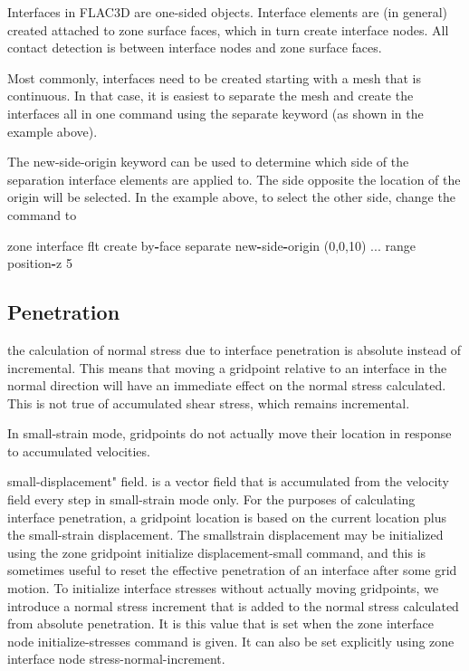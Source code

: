 \documentclass[a4paper, nobind]{templates/ociamthesis}
\newenvironment{Shaded}{\begin{snugshade}}{\end{snugshade}}
\newcommand{\BuiltInTok}[1]{#1}
\newcommand{\DecValTok}[1]{\textcolor[rgb]{0.00,0.00,0.81}{#1}}
\newcommand{\NormalTok}[1]{#1}
\newcommand{\OperatorTok}[1]{\textcolor[rgb]{0.81,0.36,0.00}{\textbf{#1}}}
\newcommand{\StringTok}[1]{\textcolor[rgb]{0.31,0.60,0.02}{#1}}
\renewenvironment{Shaded}
{
  \vspace{10pt}%
  \begin{snugshade}%
}{%
  \end{snugshade}%
  \vspace{8pt}%
}
\begin{document}
Interfaces in FLAC3D are one-sided objects. Interface elements are (in
general) created attached to zone surface faces, which in turn create
interface nodes. All contact detection is between interface nodes and
zone surface faces.

Most commonly, interfaces need to be created starting with a mesh that
is continuous. In that case, it is easiest to separate the mesh and
create the interfaces all in one command using the separate keyword (as
shown in the example above).

The new-side-origin keyword can be used to determine which side of the
separation interface elements are applied to. The side opposite the
location of the origin will be selected. In the example above, to select
the other side, change the command to

\begin{Shaded}
\begin{Highlighting}[]
\NormalTok{zone interface }\StringTok{\textquotesingle{}flt\textquotesingle{}}\NormalTok{ create by}\OperatorTok{{-}}\NormalTok{face separate new}\OperatorTok{{-}}\NormalTok{side}\OperatorTok{{-}}\NormalTok{origin (}\DecValTok{0}\NormalTok{,}\DecValTok{0}\NormalTok{,}\DecValTok{10}\NormalTok{) ...}
\BuiltInTok{range}\NormalTok{ position}\OperatorTok{{-}}\NormalTok{z }\DecValTok{5}
\end{Highlighting}
\end{Shaded}

\hypertarget{penetration}{%
\subsection{Penetration}\label{penetration}}

the calculation of normal stress due to interface penetration is
absolute instead of incremental. This means that moving a gridpoint
relative to an interface in the normal direction will have an immediate
effect on the normal stress calculated. This is not true of accumulated
shear stress, which remains incremental.

In small-strain mode, gridpoints do not actually move their location in
response to accumulated velocities.

small-displacement" field. is a vector field that is accumulated from
the velocity field every step in small-strain mode only. For the
purposes of calculating interface penetration, a gridpoint location is
based on the current location plus the small-strain displacement. The
smallstrain displacement may be initialized using the zone gridpoint
initialize displacement-small command, and this is sometimes useful to
reset the effective penetration of an interface after some grid motion.
To initialize interface stresses without actually moving gridpoints, we
introduce a normal stress increment that is added to the normal stress
calculated from absolute penetration. It is this value that is set when
the zone interface node initialize-stresses command is given. It can
also be set explicitly using zone interface node
stress-normal-increment.
\end{document}
